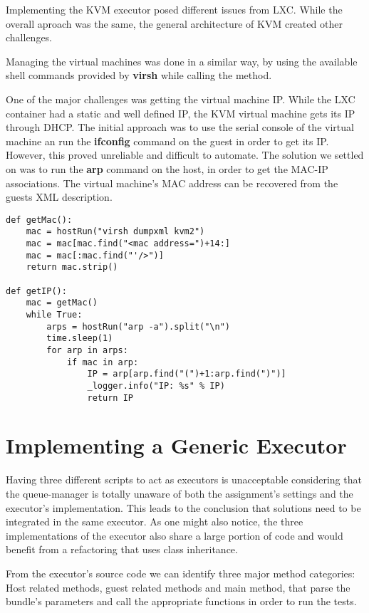 Implementing the KVM executor posed different issues from LXC. While the
overall aproach was the same, the general architecture of KVM created other
challenges. 

Managing the virtual machines was done in a similar way, by using the available
shell commands provided by \textbf{virsh} while calling the  method.

One of the major challenges was getting the virtual machine IP. While the
LXC container had a static and well defined IP, the KVM virtual machine gets
its IP through DHCP. The initial approach was to use the serial console of 
the virtual machine an run the \textbf{ifconfig} command on the guest in order
to get its IP. However, this proved unreliable and difficult to automate. The
solution we settled on was to run the \textbf{arp} command on the host, in order
to get the MAC-IP associations. The virtual machine's MAC address can be
recovered from the guests XML description.

\lstset{caption=Getting the KVM Guest's IP, label=lst:kvm-ip}
\begin{lstlisting}
def getMac():
    mac = hostRun("virsh dumpxml kvm2")
    mac = mac[mac.find("<mac address=")+14:]
    mac = mac[:mac.find("'/>")]
    return mac.strip()
    
def getIP():
    mac = getMac()
    while True:
        arps = hostRun("arp -a").split("\n")
        time.sleep(1)
        for arp in arps:
            if mac in arp:
                IP = arp[arp.find("(")+1:arp.find(")")]
                _logger.info("IP: %s" % IP)
                return IP
\end{lstlisting}
       

\section{Implementing a Generic Executor}
\label{sec:vmc-generic}


Having three different scripts to act as executors is unacceptable considering
that the queue-manager is totally unaware of both the assignment's settings
and the executor's implementation. This leads to the conclusion that solutions
need to be integrated in the same executor. As one might also notice, the
three implementations of the executor also share a large portion of code and
would benefit from a refactoring that uses class inheritance.

From the executor's source code we can identify three major method categories:
Host related methods, guest related methods and main method, that parse the
bundle's parameters and call the appropriate functions in order to run the tests.


